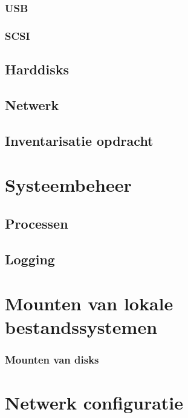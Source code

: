 \documentclass[a4paper,12pt,twoside,openright,titlepage]{book}
\begin{document}
\subsection{USB}

\subsection{SCSI}

\section{Harddisks}





\section{Netwerk}

\section{Inventarisatie opdracht}


\chapter{Systeembeheer}
\section{Processen}
\section{Logging}

\chapter{Mounten van lokale bestandssystemen}

\subsection{Mounten van disks}


\chapter{Netwerk configuratie}
\end{document}

